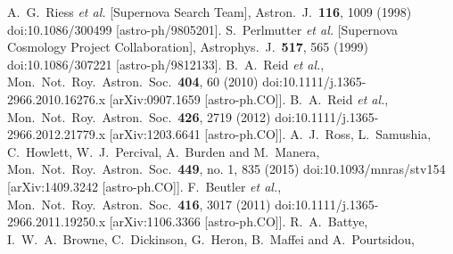 \documentclass[aps,prd,amsmath,amssymb,showpacs,floats,floatfix,nofootinbib,reprint]{revtex4-1}
\begin{document}
\begin{thebibliography}{99}
  
  A.~G.~Riess {\it et al.} [Supernova Search Team],
  Astron.\ J.\  {\bf 116}, 1009 (1998)
  doi:10.1086/300499
  [astro-ph/9805201].
  S.~Perlmutter {\it et al.} [Supernova Cosmology Project Collaboration],
  Astrophys.\ J.\  {\bf 517}, 565 (1999)
  doi:10.1086/307221
  [astro-ph/9812133].
  B.~A.~Reid {\it et al.},
  Mon.\ Not.\ Roy.\ Astron.\ Soc.\  {\bf 404}, 60 (2010)
  doi:10.1111/j.1365-2966.2010.16276.x
  [arXiv:0907.1659 [astro-ph.CO]].
  B.~A.~Reid {\it et al.},
  Mon.\ Not.\ Roy.\ Astron.\ Soc.\  {\bf 426}, 2719 (2012)
  doi:10.1111/j.1365-2966.2012.21779.x
  [arXiv:1203.6641 [astro-ph.CO]].
  A.~J.~Ross, L.~Samushia, C.~Howlett, W.~J.~Percival, A.~Burden and M.~Manera,
  Mon.\ Not.\ Roy.\ Astron.\ Soc.\  {\bf 449}, no. 1, 835 (2015)
  doi:10.1093/mnras/stv154
  [arXiv:1409.3242 [astro-ph.CO]].
  F.~Beutler {\it et al.},
  Mon.\ Not.\ Roy.\ Astron.\ Soc.\  {\bf 416}, 3017 (2011)
  doi:10.1111/j.1365-2966.2011.19250.x
  [arXiv:1106.3366 [astro-ph.CO]].
  R.~A.~Battye, I.~W.~A.~Browne, C.~Dickinson, G.~Heron, B.~Maffei and A.~Pourtsidou,

\end{thebibliography}
\end{document}
